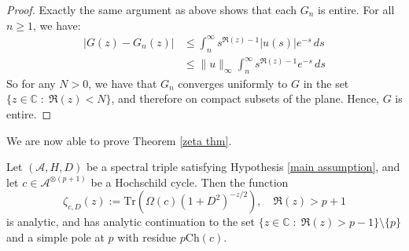 \begin{proof}
        Exactly the same argument as above shows that each $G_n$ is entire. 
        For all $n\geq 1$, we have:
        \begin{align*}
            |G(z)-G_n(z)| &\leq \int_n^\infty s^{\Re(z)-1}|u(s)|e^{-s}\,ds\\
                          &\leq \|u\|_{\infty} \int_n^\infty s^{\Re(z)-1}e^{-s}\,ds
        \end{align*}
        So for any $N > 0$, we have that $G_n$ converges uniformly to $G$ in the set $\{z \in \mathbb{C}\;:\;\Re(z) < N\}$, and therefore on compact subsets of the plane. Hence, $G$ is
        entire.
    \end{proof}
    
    We are now able to prove Theorem \ref{zeta thm}.
    \begin{thm*}
        Let $(\mathcal{A},H,D)$ be a spectral triple satisfying Hypothesis \ref{main assumption}, and let $c \in \mathcal{A}^{\otimes (p+1)}$ be a Hochschild cycle. Then
        the function
        \begin{equation*}
            \zeta_{c,D}(z) := \mathrm{Tr}(\Omega(c)(1+D^2)^{-z/2}),\quad \Re(z) > p+1
        \end{equation*}
        is analytic, and has analytic continuation to the set $\{z \in \mathbb{C}\;:\;\Re(z) > p-1\}\setminus \{p\}$ and a simple pole at $p$ with residue $p\mathrm{Ch}(c)$.
    \end{thm*}
